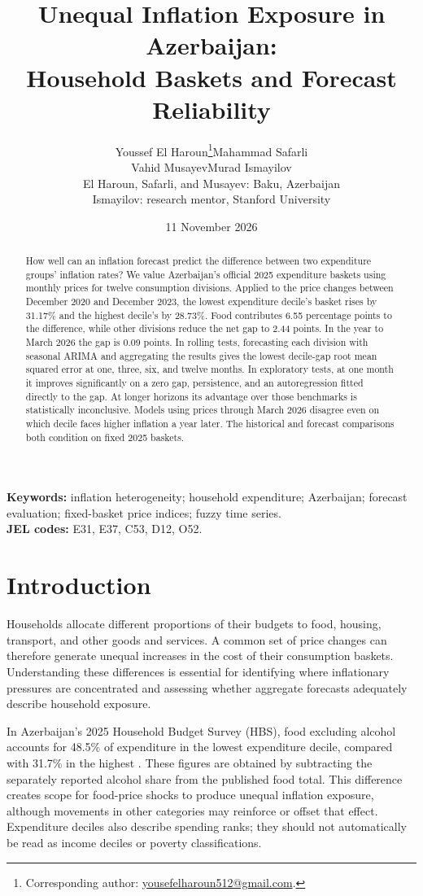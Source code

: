 \documentclass[11pt,a4paper]{article}
\title{\textbf{Unequal Inflation Exposure in Azerbaijan:\\Household Baskets and Forecast Reliability}}
\author{Youssef El Haroun\thanks{Corresponding author: \href{mailto:yousefelharoun512@gmail.com}{yousefelharoun512@gmail.com}.}\qquad Mahammad Safarli\\
Vahid Musayev\qquad Murad Ismayilov\\[0.45em]
\small El Haroun, Safarli, and Musayev: Baku, Azerbaijan\\
\small Ismayilov: research mentor, Stanford University}
\date{11 November 2026}
\begin{document}
\maketitle
\thispagestyle{plain}

\begin{abstract}
How well can an inflation forecast predict the difference between two expenditure groups' inflation rates? We value Azerbaijan's official 2025 expenditure baskets using monthly prices for twelve consumption divisions. Applied to the price changes between December 2020 and December 2023, the lowest expenditure decile's basket rises by 31.17\% and the highest decile's by 28.73\%. Food contributes 6.55 percentage points to the difference, while other divisions reduce the net gap to 2.44 points. In the year to March 2026 the gap is 0.09 points. In rolling tests, forecasting each division with seasonal ARIMA and aggregating the results gives the lowest decile-gap root mean squared error at one, three, six, and twelve months. In exploratory tests, at one month it improves significantly on a zero gap, persistence, and an autoregression fitted directly to the gap. At longer horizons its advantage over those benchmarks is statistically inconclusive. Models using prices through March 2026 disagree even on which decile faces higher inflation a year later. The historical and forecast comparisons both condition on fixed 2025 baskets.
\end{abstract}

\noindent\textbf{Keywords:} inflation heterogeneity; household expenditure; Azerbaijan; forecast evaluation; fixed-basket price indices; fuzzy time series.\\[0.25em]
\noindent\textbf{JEL codes:} E31, E37, C53, D12, O52.

\section{Introduction}

Households allocate different proportions of their budgets to food, housing, transport, and other goods and services. A common set of price changes can therefore generate unequal increases in the cost of their consumption baskets. Understanding these differences is essential for identifying where inflationary pressures are concentrated and assessing whether aggregate forecasts adequately describe household exposure.

In Azerbaijan's 2025 Household Budget Survey (HBS), food excluding alcohol accounts for 48.5\% of expenditure in the lowest expenditure decile, compared with 31.7\% in the highest \citep[Table 61, p.~72]{azstat2026}. These figures are obtained by subtracting the separately reported alcohol share from the published food total. This difference creates scope for food-price shocks to produce unequal inflation exposure, although movements in other categories may reinforce or offset that effect. Expenditure deciles also describe spending ranks; they should not automatically be read as income deciles or poverty classifications.
\end{document}
